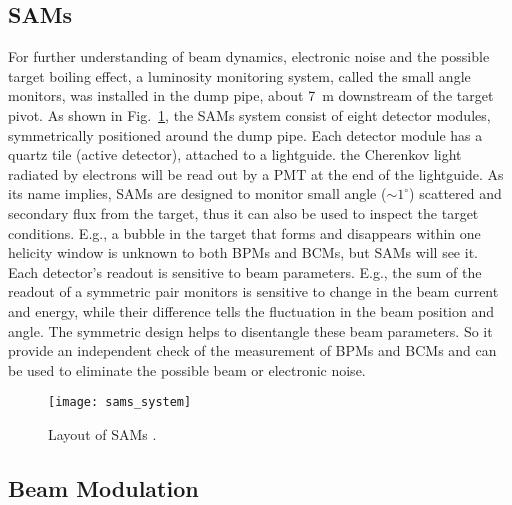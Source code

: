 \subsection{SAMs}
For further understanding of beam dynamics, electronic noise and the possible target 
boiling effect, a luminosity monitoring system, called the small angle monitors, 
was installed in the dump pipe, about 7~m downstream of the target pivot. As shown
in Fig.~\ref{fig:sams}, the SAMs system consist of eight detector modules, symmetrically 
positioned around the dump pipe. Each detector module has a quartz tile (active 
detector), attached to a lightguide. the Cherenkov light radiated by electrons	%
will be read out by a PMT at the end of the lightguide. 
As its name implies, SAMs are designed to monitor small angle ($\sim 1^\circ$)
scattered and secondary flux from the target, thus it can also be used to
inspect the target conditions. E.g., a bubble in the target that forms and disappears
within one helicity window is unknown to both BPMs and BCMs, but SAMs will see it.
Each detector's readout is sensitive to beam parameters.
E.g., the sum of the readout of a symmetric pair monitors is sensitive to change 
in the beam current and energy, while their difference tells the fluctuation in 
the beam position and angle.
The symmetric design helps to disentangle these beam parameters. So it provide
an independent check of the measurement of BPMs and BCMs and can be used to eliminate
the possible beam or electronic noise.
\begin{figure}[!h]
    \centering
    \texttt{[image: sams\_system]}
    \caption{Layout of SAMs \cite{Devi2021}.}
    \label{fig:sams}
\end{figure}

\subsection{Beam Modulation}
\begin{comment}
It is very important for PVES to control the systematic uncertainty, especially
the one from beam fluctuation (HCBA). Ideally, the electrons bunches with opposite
polarization should have exactly the same intensity and energy, hitting the target 
at the same place with the same angle, which is obviously impossible in reality. 
So we need to correct the false asymmetry introduce by the beam fluctuation. There are a
few methods to do the correction, one of them is the so-called Beam modulation.
The idea is to introduce man-made fluctuations to the beam through the 
modulation system, then we can measure the changes in monitors and detectors 
to find the sensitivities of detectors to changes in energy, position and angle,
which will be used to correct the measured asymmetry.
\end{comment}

